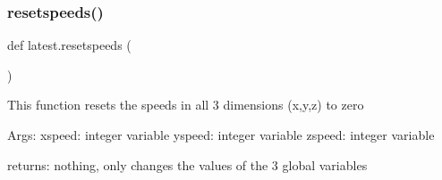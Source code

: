 \subsubsection{\texorpdfstring{resetspeeds()}{resetspeeds()}}
{\footnotesize\ttfamily def latest.\+resetspeeds (\begin{DoxyParamCaption}{ }\end{DoxyParamCaption})}

\begin{DoxyVerb}This function resets the speeds in all 3 dimensions (x,y,z) to zero

Args:
    xspeed: integer variable
    yspeed: integer variable
    zspeed: integer variable

returns:
    nothing, only changes the values of the 3 global variables
\end{DoxyVerb}
 
